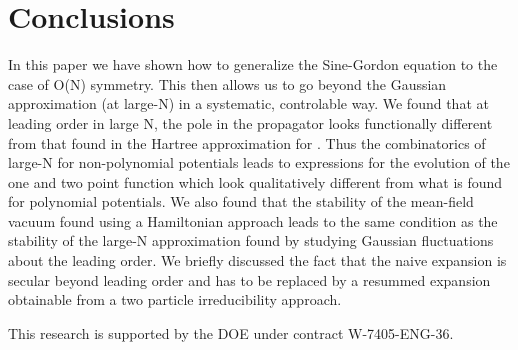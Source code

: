 \documentclass[a4paper,prd,preprint,superscriptaddress,showpacs,byrevtex]{revtex4}
\begin{document}
\section{Conclusions}
In this paper we have shown how to generalize the Sine-Gordon equation to the case of
O(N) symmetry.  This then allows  us to go beyond the Gaussian
approximation (at large-N) in a systematic, controlable way.  We found that at
leading order in large N, the pole in the propagator looks functionally
different from that found in the Hartree approximation for \coordHE{}. Thus the
combinatorics of large-N for non-polynomial potentials leads to expressions for
the evolution of the one and two point function which look qualitatively
different from what is found for polynomial potentials. We also found that the
stability of the mean-field vacuum found using a Hamiltonian approach leads to
the same condition as the stability of the large-N approximation found by
studying Gaussian fluctuations about the leading order. We briefly
discussed the fact that the naive \coordHE{} expansion is secular beyond leading
order and has to be replaced by a resummed \coordHE{} expansion obtainable from a
two particle irreducibility approach. 

\acknowledgments This research is supported by the DOE under contract
W-7405-ENG-36.
\end{document}
